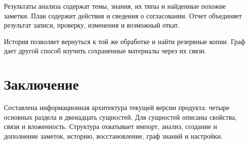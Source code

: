 Результаты анализа содержат темы, знания, их типы и найденные похожие заметки. План содержит действия и сведения о согласовании. Отчет объединяет результат записи, проверку, изменения и возможный откат.


История позволяет вернуться к той же обработке и найти резервные копии. Граф дает другой способ изучить сохраненные материалы через их связи.


\section{Заключение}

Составлена информационная архитектура текущей версии продукта: четыре основных раздела и двенадцать сущностей. Для сущностей описаны свойства, связи и вложенность. Структура охватывает импорт, анализ, создание и дополнение заметок, историю, восстановление, граф знаний и настройки.


